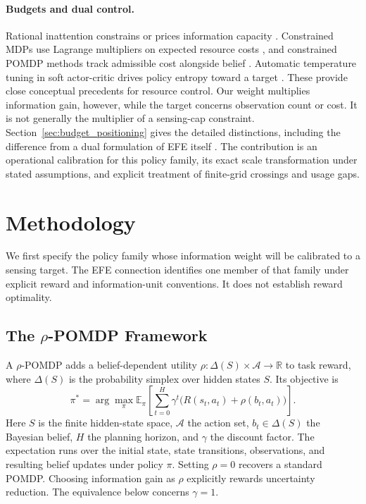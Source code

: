 \documentclass[runningheads]{llncs}
\begin{document}
\paragraph{Budgets and dual control.}
Rational inattention constrains or prices information capacity \citep{sims2003,matejka2015}. Constrained MDPs use Lagrange multipliers on expected resource costs \citep{altman1999}, and constrained POMDP methods track admissible cost alongside belief \citep{kim2011cpomdp}. Automatic temperature tuning in soft actor-critic drives policy entropy toward a target \citep{haarnoja2018sac}. These provide close conceptual precedents for resource control. Our weight multiplies information gain, however, while the target concerns observation count or cost. It is not generally the multiplier of a sensing-cap constraint. Section~\ref{sec:budget_positioning} gives the detailed distinctions, including the difference from a dual formulation of EFE itself \citep{kouw2026bethe}. The contribution is an operational calibration for this policy family, its exact scale transformation under stated assumptions, and explicit treatment of finite-grid crossings and usage gaps.

\section{Methodology}
\label{sec:methodology}

We first specify the policy family whose information weight will be calibrated to a sensing target. The EFE connection identifies one member of that family under explicit reward and information-unit conventions. It does not establish reward optimality.

\subsection{The $\rho$-POMDP Framework}

A $\rho$-POMDP adds a belief-dependent utility $\rho:\Delta(S)\times\mathcal{A}\to\mathbb{R}$ to task reward, where $\Delta(S)$ is the probability simplex over hidden states $S$. Its objective is
\begin{equation}
\pi^* = \arg\max_\pi \mathbb{E}_\pi\!\left[\sum_{t=0}^{H}\gamma^t\big(R(s_t,a_t)+\rho(b_t,a_t)\big)\right].
\end{equation}
Here $S$ is the finite hidden-state space, $\mathcal A$ the action set, $b_t\in\Delta(S)$ the Bayesian belief, $H$ the planning horizon, and $\gamma$ the discount factor. The expectation runs over the initial state, state transitions, observations, and resulting belief updates under policy $\pi$. Setting $\rho=0$ recovers a standard POMDP. Choosing information gain as $\rho$ explicitly rewards uncertainty reduction. The equivalence below concerns $\gamma=1$.
\end{document}
